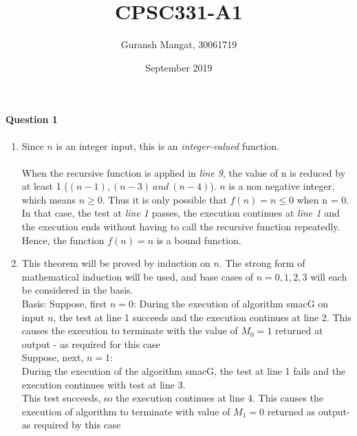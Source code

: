 \documentclass{article}
\title{CPSC331-A1}
\author{Guransh Mangat, 30061719 }
\date{September 2019}
\begin{document}
\maketitle

\paragraph{Question 1}

\begin{enumerate}
    \item Since $n$ is an integer input, this is an \textit{integer-valued} function.\\ \\ When the recursive function is applied in \textit{line 9}, the value of n is reduced by at least 1 ($(n-1), (n-3) \ and \ (n-4)$). \newline \newline $n$ is a non negative integer, which means $n \geq 0$. Thus it is only possible that $ f(n) = n \leq 0$ when n = 0. In that case, the test at \textit{line 1} passes, the execution continues at \textit{line 1} and the execution ends without having to call the recursive function repeatedly. \newline \newline Hence, the function $f(n) = n$ is a bound function. 
    
    \item This theorem will be proved by induction on $n$. The strong form of mathematical induction will be used, and base cases of $n = 0, 1, 2 ,3$ will each be considered in the basis.\\
    
    Basis: Suppose, first $n = 0$: \newline During the execution of algorithm smacG on input $n$, the test at line 1 succeeds and the execution continues at line 2. This causes the execution to terminate with the value of $M_0 = 1$ returned at output - as required for this case \\ 
    
    Suppose, next, $n = 1$: \\ During the execution of the algorithm smacG, the test at line 1 fails and the execution continues with test at line 3. \\ This test succeeds, so the execution continues at line 4. This causes the execution of algorithm to terminate with value of $M_1 = 0$ returned as output- as required by this case \\ 
    

\end{enumerate}
\end{document}
